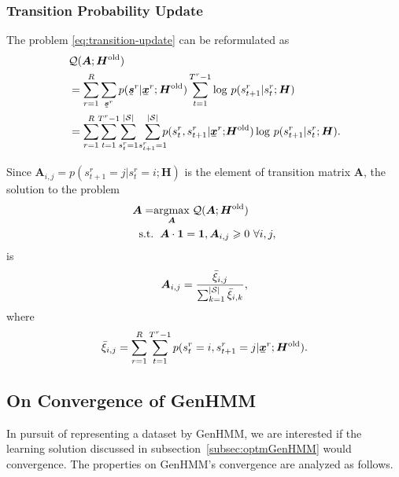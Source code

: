 \documentclass[letterpaper]{article} %
\newcommand{\ubar}[1]{\mkern2mu\underline{\mkern-2mu #1\mkern-2mu}\mkern2mu}
\newcommand{\ubmr}[2]{\ubar{\bm{#1}}^{#2}}
\newcommand{\smtr}[3]{{#1}^{#3}_{#2}}
\begin{document}
\subsubsection{Transition Probability Update}
The problem \eqref{eq:transition-update} can be reformulated as
\begin{align}
  &\Qq(\bm{A}; \bm{H}^{\mathrm{old}})\nonumber \\
  &= \sum_{r=1}^{R} \sum_{\ubmr{s}{r}}{p(\ubmr{s}{r}| \ubmr{x}{r}; \bm{H}^{\mathrm{old}})} \sum_{t=1}^{T^{r}-1}\log\,p(\smtr{s}{t+1}{r}|\smtr{s}{t}{r}; \bm{H}) \nonumber \\
  &= \sum_{r=1}^{R} \hspace{-0.1cm}\sum_{t=1}^{T^{r}-1}\hspace{-0.1cm} \sum_{\smtr{s}{t}{r}=1}^{|\Ss|}\hspace{-0.05cm}\sum_{\smtr{s}{t+1}{r}=1}^{|\Ss|}\hspace{-0.2cm}{p(\smtr{s}{t}{r}, \smtr{s}{t+1}{r}| \ubmr{x}{r};\hspace{-0.05cm} \bm{H}^{\mathrm{old}})} \log\,p(\smtr{s}{t+1}{r}|\smtr{s}{t}{r}; \bm{H}).
\end{align}

Since $\bm{A}_{i, j}  = p(\smtr{s}{t+1}{r}=j|\smtr{s}{t}{r}=i; \bm{H})$ is the element of transition matrix $\bm{A}$, the solution to the problem
\begin{align}\label{eq:update-transition-prob}
  \bm{A} = &\underset{\bm{A}}{\operatorname{argmax}}\; \mathcal{Q}(\bm{A}; \bm{H}^{\mathrm{old}}) \nonumber \\
  \mathrm{s.t.} &\hspace{0.2cm} \bm{A} \cdot \bm{1} = \bm{1}, \bm{A}_{i,j} \geqslant 0 \,\, \forall i,j,
\end{align}
is
\begin{equation}
  \bm{A}_{i,j} = \frac{\bar{\xi}_{i,j}}{\sum_{k = 1}^{|\mathcal{S}|} \bar{\xi}_{i,k}},
\end{equation}
where
\begin{equation}\label{eq:update-transition-solt}
  \bar{\xi}_{i,j} = \sum_{r= 1}^{R} \sum_{t= 1}^{T^{r}-1}{p(\smtr{s}{t}{r}=i, \smtr{s}{t+1}{r}=j| \ubmr{x}{r}; \bm{H}^{\mathrm{old}})}.
\end{equation}
\subsection{On Convergence of GenHMM}
In pursuit of representing a dataset by GenHMM,  we are interested if the learning solution discussed in subsection~\ref{subsec:optmGenHMM} would convergence. The properties on GenHMM's convergence are analyzed as follows.
\end{document}
